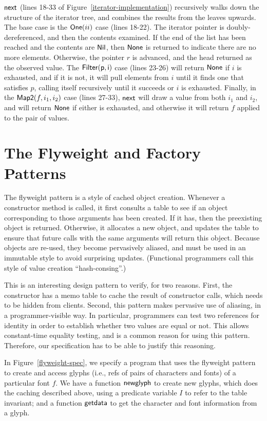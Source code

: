 $\mathsf{next}$ (lines 18-33 of Figure~\ref{iterator-implementation})
recursively walks down the structure of the iterator tree, and
combines the results from the leaves upwards.  The base case is the
$\mathsf{One}(ii)$ case (lines 18-22). The iterator pointer is
doubly-dereferenced, and then the contents examined. If the end of the
list has been reached and the contents are $\mathsf{Nil}$, then $\mathsf{None}$ is
returned to indicate there are no more elements. Otherwise, the
pointer $r$ is advanced, and the head returned as the observed
value. The $\mathsf{Filter(p,i)}$ case (lines 23-26) will return
$\mathsf{None}$ if $i$ is exhausted, and if it is not, it will pull elements
from $i$ until it finds one that satisfies $p$, calling itself
recursively until it succeeds or $i$ is exhausted.  Finally, in the
$\mathsf{Map2}(f, i_1, i_2)$ case (lines 27-33), $\mathsf{next}$ will draw
a value from both $i_1$ and $i_2$, and will return $\mathsf{None}$ if either
is exhausted, and otherwise it will return $f$ applied to the pair of
values.


\section{The Flyweight and Factory Patterns}

The flyweight pattern is a style of cached object creation. Whenever a
constructor method is called, it first consults a table to see if an
object corresponding to those arguments has been created. If it has,
then the preexisting object is returned.  Otherwise, it allocates a
new object, and updates the table to ensure that future calls with the
same arguments will return this object. Because objects are re-used,
they become pervasively aliased, and must be used in an immutable
style to avoid surprising updates. (Functional programmers call this
style of value creation ``hash-consing''.)

This is an interesting design pattern to verify, for two reasons.
First, the constructor has a memo table to cache the result of
constructor calls, which needs to be hidden from clients. Second, this
pattern makes pervasive use of aliasing, in a programmer-visible
way. In particular, programmers can test two references for identity
in order to establish whether two values are equal or not. This allows
constant-time equality testing, and is a common reason for using this
pattern. Therefore, our specification has to be able to justify this
reasoning.

In Figure~\ref{flyweight-spec}, we specify a program that uses the
flyweight pattern to create and access glyphs (i.e., refs of pairs of
characters and fonts) of a particular font $f$. We have a function
$\mathsf{newglyph}$ to create new glyphs, which does the caching
described above, using a predicate variable $I$ to refer to the table
invariant; and a function $\mathsf{getdata}$ to get the character and
font information from a glyph.

